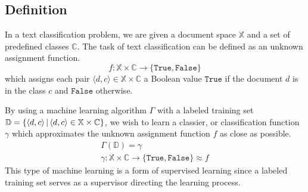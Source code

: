 \subsection{Definition}
In a text classification problem, we are given a document space $\mathbb{X}$ and a set of predefined classes $\mathbb{C}$. The task of text classification can be defined as an unknown assignment function.
\begin{equation*}
f: \mathbb{X} \times \mathbb{C} \rightarrow \{\mathtt{True},\mathtt{False}\}
\end{equation*}
which assigns each pair $\langle d,c \rangle \in \mathbb{X} \times \mathbb{C}$ a Boolean value $\mathtt{True}$ if the document $d$ is in the class $c$ and $\mathtt{False}$ otherwise.
~\newline
{}
\par By using a machine learning algorithm $\Gamma$ with a labeled training set $\mathbb{D}=\{ \langle d,c \rangle \operatorname{\mid\,} \langle d,c \rangle \in \mathbb{X} \times \mathbb{C} \}$, we wish to learn a classier, or classification function $\gamma$ which approximates the unknown assignment function $f$ as close as possible\cite{sebastiani2002tc}.
\begin{equation*}
\begin{gathered}
	\Gamma(\mathbb{D}) = \gamma
\\
	\gamma: \mathbb{X} \times \mathbb{C} \rightarrow \{\texttt{True},\texttt{False}\} \approx f
\end{gathered}
\end{equation*}
This type of machine learning is a form of supervised learning since a labeled training set serves as a supervisor directing the learning process.

